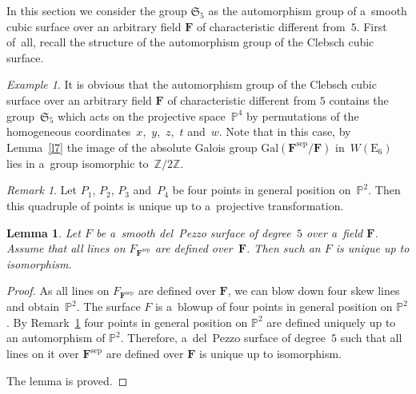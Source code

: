 \documentclass{amsart}
\numberwithin{equation}{section}
\theoremstyle{plain}
\newtheorem{lemma}{Lemma}
\theoremstyle{definition}
\theoremstyle{remark}
\newtheorem{remark}{Remark}
\newtheorem{example}{Example}
\begin{document}
In this section we consider the group $\mathfrak{S}_5$ as the automorphism group of a~smooth cubic surface over an arbitrary field $\mathbf{F}$ of characteristic different from~$5$. First of~all, recall the structure of the automorphism group of the Clebsch cubic surface.

\begin{example}
\label{e2}
It is obvious that the automorphism group of the Clebsch cubic surface over an arbitrary field $\mathbf{F}$ of characteristic different from $5$ contains the group~$\mathfrak{S}_5$ which acts on the projective space~$\mathbb{P}^4$ by permutations of the homogeneous coordinates~$x$,~$y$,~$z$,~$t$ and~$w$. Note that in this case, by Lemma~\ref{l7} the image of the absolute Galois group $\mathrm{Gal}(\mathbf{F}^{\mathrm{sep}}/\mathbf{F})$ in~$W(\mathrm{E}_6)$ lies in a~group isomorphic to~$\mathbb{Z}/2\mathbb{Z}$.
\end{example}

\begin{remark}
\label{r5}
Let $P_1$, $P_2$, $P_3$ and~$P_4$ be four points in general position on~$\mathbb{P}^2$. Then this quadruple of points is unique up to a~projective transformation. 
\end{remark}

\begin{lemma}
\label{l19}
Let $F$ be a~smooth del~Pezzo surface of degree~$5$ over a~field $\mathbf{F}$. Assume that all lines on $F_{\mathbf{F}^{\mathrm{sep}}}$ are defined over~$\mathbf{F}$. Then such an $F$ is unique up to isomorphism.
\end{lemma}

\begin{proof}
As all lines on $F_{\mathbf{F}^{\mathrm{sep}}}$ are defined over $\mathbf{F}$, we can blow down four skew lines and obtain~$\mathbb{P}^2$. The surface $F$ is a~blowup of four points in general position on $\mathbb{P}^2$. By Remark~\ref{r5} four points in general position on $\mathbb{P}^2$ are defined uniquely up to an automorphism of $\mathbb{P}^2$. %
Therefore, a~del~Pezzo surface of degree~$5$ such that all lines on it over $\mathbf{F}^{\mathrm{sep}}$ are defined over $\mathbf{F}$ is unique up to isomorphism.

The lemma is proved.
\end{proof}
\end{document}
